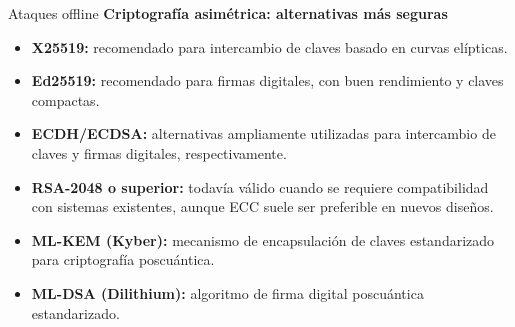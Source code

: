 \documentclass[aspectratio=169,11pt]{beamer}
\newcommand{\lead}[1]{{\bfseries #1}\par\medskip}
\begin{document}
\begin{frame}{Ataques offline}
\small
\lead{Criptografía asimétrica: alternativas más seguras}
\begin{itemize}
    \item \textbf{X25519:} recomendado para intercambio de claves basado en curvas elípticas.

    \item \textbf{Ed25519:} recomendado para firmas digitales, con buen rendimiento y claves compactas.

    \item \textbf{ECDH/ECDSA:} alternativas ampliamente utilizadas para intercambio de claves y firmas digitales, respectivamente.

    \item \textbf{RSA-2048 o superior:} todavía válido cuando se requiere compatibilidad con sistemas existentes, aunque ECC suele ser preferible en nuevos diseños.

    \item \textbf{ML-KEM (Kyber):} mecanismo de encapsulación de claves estandarizado para criptografía poscuántica.

    \item \textbf{ML-DSA (Dilithium):} algoritmo de firma digital poscuántica estandarizado.
\end{itemize}
\end{frame}
\end{document}
